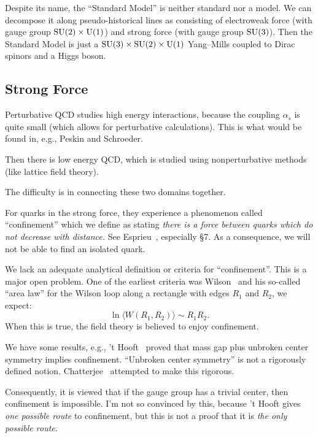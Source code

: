 \M
Despite its name, the ``Standard Model'' is neither standard nor a
model. We can decompose it along pseudo-historical lines as consisting
of electroweak force (with gauge group $\operatorname{SU}(2)\times\operatorname{U}(1)$)
and strong force (with gauge group $\operatorname{SU}(3)$). Then the Standard Model
is just a $\operatorname{SU}(3)\times\operatorname{SU}(2)\times\operatorname{U}(1)$ Yang--Mills coupled
to Dirac spinors and a Higgs boson.

\subsection{Strong Force}


\M
Perturbative QCD studies high energy interactions, because the coupling
$\alpha_{s}$ is quite small (which allows for perturbative calculations).
This is what would be found in, e.g., Peskin and Schroeder.

Then there is low energy QCD, which is studied using nonperturbative
methods (like lattice field theory).

The difficulty is in connecting these two domains together.

 For quarks in the strong force, they experience a
phenomenon called ``confinement'' which we define as stating \emph{there
is a force between quarks which do not decrease with distance.} See
Esprieu~\cite{Espriu:1994br}, especially \S7. As a consequence, we will
not be able to find an isolated quark.

We lack an adequate analytical definition or criteria for ``confinement''.
This is a major open problem. One of the earliest criteria was Wilson~\cite{Wilson:1974sk}
and his so-called ``area law'' for the Wilson loop along a
rectangle with edges $R_{1}$ and $R_{2}$, we expect:
\begin{equation}
\ln\langle W(R_{1}, R_{2})\rangle\sim R_{1}R_{2}.
\end{equation}
When this is true, the field theory is believed to enjoy confinement.

\begin{remark}[Folklore]
We have some results, e.g., 't Hooft~\cite{tHooft:1977nqb} proved that
mass gap plus unbroken center symmetry implies confinement.
``Unbroken center symmetry'' is not a rigorously defined notion.
Chatterjee~\cite{Chatterjee:2020nrl} attempted to make this rigorous.

Consequently, it is viewed that if the gauge group has a trivial center,
then confinement is impossible. I'm not so convinced by this, because 't
Hooft gives \emph{one possible route} to confinement, but this is not a
proof that it is \emph{the only possible route}.
\end{remark}

